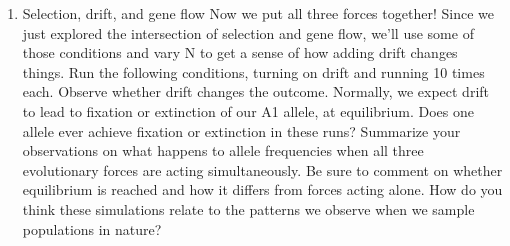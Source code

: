 \begin{enumerate}
  Trial

  N

  p0

  toggledrift (\# runs)

  wA1A1

  wA1A2

  wA2A2

  pm

  m

  Description

  3a

  500

  0.1

  0

  1

  0.9

  0.8

  0.6

  0

  no migration, s = 0.2

  3b

  500

  0.1

  0

  1

  0.9

  0.8

  0.6

  0.035

  low migration, s = 0.2

  3c

  500

  0.1

  0

  1

  0.9

  0.8

  0.6

  0.1

  high migration, s = 0.2

  3d

  500

  0.1

  0

  1

  0.75

  0.5

  0.6

  0.1

  high migration, s = 0.5
\item
  Selection, drift, and gene flow Now we put all three forces together!
  Since we just explored the intersection of selection and gene flow,
  we'll use some of those conditions and vary N to get a sense of how
  adding drift changes things. Run the following conditions, turning on
  drift and running 10 times each. Observe whether drift changes the
  outcome. Normally, we expect drift to lead to fixation or extinction
  of our A1 allele, at equilibrium. Does one allele ever achieve
  fixation or extinction in these runs? Summarize your observations on
  what happens to allele frequencies when all three evolutionary forces
  are acting simultaneously. Be sure to comment on whether equilibrium
  is reached and how it differs from forces acting alone. How do you
  think these simulations relate to the patterns we observe when we
  sample populations in nature?


\end{enumerate}
